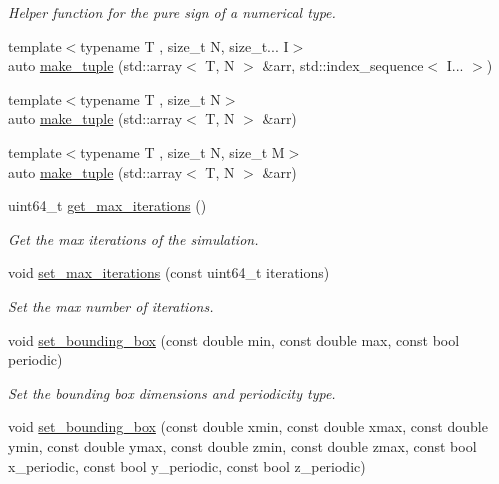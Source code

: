 \begin{DoxyCompactItemize}
\begin{DoxyCompactList}\small\item\em Helper function for the pure sign of a numerical type. \end{DoxyCompactList}\item 
{\footnotesize template$<$typename T , size\+\_\+t N, size\+\_\+t... I$>$ }\\auto \mbox{\hyperlink{namespacewash_ae34701c709b5a3bace6dfc0e19dcf01b}{make\+\_\+tuple}} (std\+::array$<$ T, N $>$ \&arr, std\+::index\+\_\+sequence$<$ I... $>$)
\item 
{\footnotesize template$<$typename T , size\+\_\+t N$>$ }\\auto \mbox{\hyperlink{namespacewash_a22d9c927a5c59b8a587e335472411ae7}{make\+\_\+tuple}} (std\+::array$<$ T, N $>$ \&arr)
\item 
{\footnotesize template$<$typename T , size\+\_\+t N, size\+\_\+t M$>$ }\\auto \mbox{\hyperlink{namespacewash_a477322dfaa4429578d544d713f5d4df9}{make\+\_\+tuple}} (std\+::array$<$ T, N $>$ \&arr)
\item 
uint64\+\_\+t \mbox{\hyperlink{namespacewash_ab59a4fff607c38a8cded277413cdafec}{get\+\_\+max\+\_\+iterations}} ()
\begin{DoxyCompactList}\small\item\em Get the max iterations of the simulation. \end{DoxyCompactList}\item 
void \mbox{\hyperlink{namespacewash_aeb7b287406244c8ab192d0524ad4da5b}{set\+\_\+max\+\_\+iterations}} (const uint64\+\_\+t iterations)
\begin{DoxyCompactList}\small\item\em Set the max number of iterations. \end{DoxyCompactList}\item 
void \mbox{\hyperlink{namespacewash_a24bef1df5fe5c24cd518f12885a51055}{set\+\_\+bounding\+\_\+box}} (const double min, const double max, const bool periodic)
\begin{DoxyCompactList}\small\item\em Set the bounding box dimensions and periodicity type. \end{DoxyCompactList}\item 
void \mbox{\hyperlink{namespacewash_a70aeb215881f159a7efb6da02e5e452b}{set\+\_\+bounding\+\_\+box}} (const double xmin, const double xmax, const double ymin, const double ymax, const double zmin, const double zmax, const bool x\+\_\+periodic, const bool y\+\_\+periodic, const bool z\+\_\+periodic)

\end{DoxyCompactItemize}
